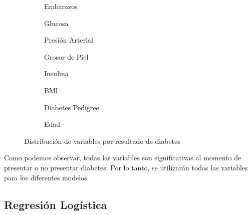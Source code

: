 \documentclass[12pt,a4paper]{article}
\begin{document}
\begin{figure}[H]
\centering
\begin{subfigure}[t]{0.24\textwidth}
    \centering
    \caption{\footnotesize Embarazos}
    \label{fig:modelo_pregnancies}
\end{subfigure}
\hfill
\begin{subfigure}[t]{0.24\textwidth}
    \centering
    \caption{\footnotesize Glucosa}
    \label{fig:modelo_glucose}
\end{subfigure}
\hfill
\begin{subfigure}[t]{0.24\textwidth}
    \centering
    \caption{\footnotesize Presión Arterial}
    \label{fig:modelo_blood_pressure}
\end{subfigure}
\hfill
\begin{subfigure}[t]{0.24\textwidth}
    \centering
    \caption{\footnotesize Grosor de Piel}
    \label{fig:modelo_skin}
\end{subfigure}

\vspace{0.2cm}

\begin{subfigure}[t]{0.24\textwidth}
    \centering
    \caption{\footnotesize Insulina}
    \label{fig:modelo_insuline}
\end{subfigure}
\hfill
\begin{subfigure}[t]{0.24\textwidth}
    \centering
    \caption{\footnotesize BMI}
    \label{fig:modelo_bmi}
\end{subfigure}
\hfill
\begin{subfigure}[t]{0.24\textwidth}
    \centering
    \caption{\footnotesize Diabetes Pedigree}
    \label{fig:modelo_diabetes}
\end{subfigure}
\hfill
\begin{subfigure}[t]{0.24\textwidth}
    \centering
    \caption{\footnotesize Edad}
    \label{fig:modelo_age}
\end{subfigure}

\caption{Distribución de variables por resultado de diabetes}
\label{fig:distribucion_variables}
\end{figure}

Como podemos observar, todas las variables son significativas al momento de presentar o no presentar diabetes. Por lo tanto, se utilizarán todas las variables para los diferentes modelos.

\vspace{0.5cm}

\subsection{Regresión Logística}
\end{document}
